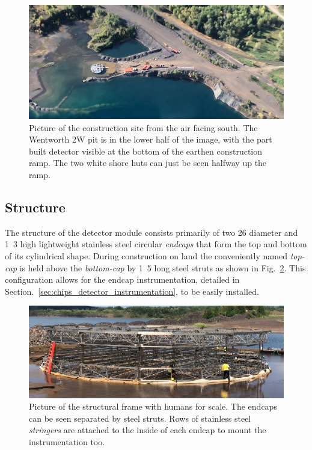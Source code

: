 \begin{figure} %
    \includegraphics[width=\textwidth]{diagrams/4-chips/from_the_air.jpeg}
    \caption[Picture of the \chipsfive construction site from the air]
    {Picture of the \chipsfive construction site from the air facing south. The Wentworth 2W pit
        is in the lower half of the image, with the part built \chipsfive detector visible at the
        bottom of the earthen construction ramp. The two white shore huts can just be seen halfway
        up the ramp.}
    \label{fig:from_the_sky}
\end{figure}

\subsection{Structure} %
\label{sec:chips_detector_structure} %

The structure of the \chipsfive detector module consists primarily of two \unit{26}{}
diameter and \unit{1.3}{} high lightweight stainless steel circular \emph{endcaps} that
form the top and bottom of its cylindrical shape. During construction on land the conveniently
named \emph{top-cap} is held above the \emph{bottom-cap} by \unit{1.5}{} long steel
struts as shown in Fig.~\ref{fig:frame}. This configuration allows for the endcap instrumentation,
detailed in Section.~\ref{sec:chips_detector_instrumentation}, to be easily installed.

\begin{figure} %
    \includegraphics[width=\textwidth]{diagrams/4-chips/frame.jpeg}
    \caption[Picture of the \chipsfive structural frame]
    {Picture of the \chipsfive structural frame with humans for scale. The endcaps can be seen
        separated by steel struts. Rows of stainless steel \emph{stringers} are attached to the
        inside of each endcap to mount the instrumentation too.}
    \label{fig:frame}
\end{figure}

